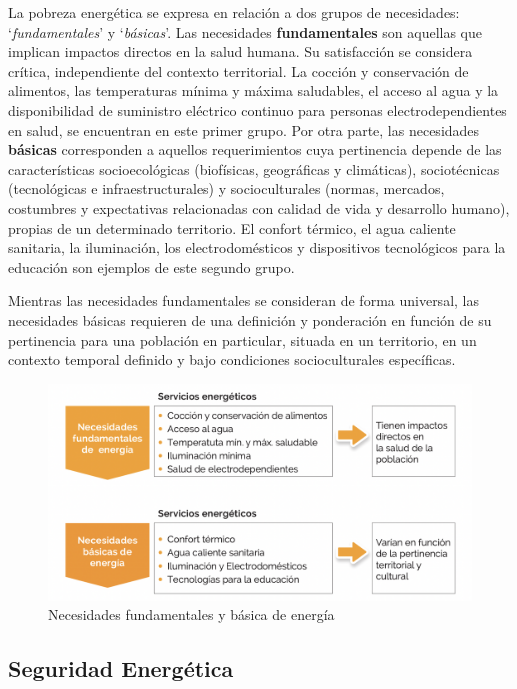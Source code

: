 \documentclass[
]{book}
\begin{document}
La pobreza energética se expresa en relación a dos grupos de necesidades: `\emph{fundamentales}' y `\emph{básicas}'. Las necesidades \textbf{fundamentales} son aquellas que implican impactos directos en la salud humana. Su satisfacción se considera crítica, independiente del contexto territorial. La cocción y conservación de alimentos, las temperaturas mínima y máxima saludables, el acceso al agua y la disponibilidad de suministro eléctrico continuo para personas electrodependientes en salud, se encuentran en este primer grupo. Por otra parte, las necesidades \textbf{básicas} corresponden a aquellos requerimientos cuya pertinencia depende de las características socioecológicas (biofísicas, geográficas y climáticas), sociotécnicas (tecnológicas e infraestructurales) y socioculturales (normas, mercados, costumbres y expectativas relacionadas con calidad de vida y desarrollo humano), propias de un determinado territorio. El confort térmico, el agua caliente sanitaria, la iluminación, los electrodomésticos y dispositivos tecnológicos para la educación son ejemplos de este segundo grupo.

Mientras las necesidades fundamentales se consideran de forma universal, las necesidades básicas requieren de una definición y ponderación en función de su pertinencia para una población en particular, situada en un territorio, en un contexto temporal definido y bajo condiciones socioculturales específicas.

\begin{figure}

{\centering \includegraphics[width=1\linewidth]{images/necedidades_energia} 

}

\caption{Necesidades fundamentales y básica de energía}\label{fig:unnamed-chunk-3}
\end{figure}

\hypertarget{seguridad-energuxe9tica}{%
\subsection{Seguridad Energética}\label{seguridad-energuxe9tica}}
\end{document}

